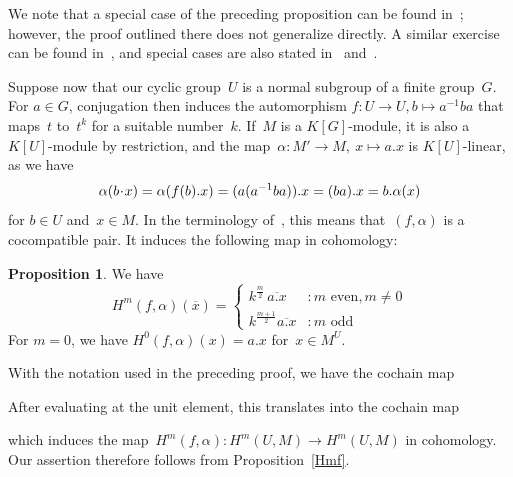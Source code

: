 \documentclass[12pt]{article}
\makeatletter
\newcounter{num}
\theoremstyle{definition}
\newtheorem{Proposition}[Satz]{Proposition}
\theoremstyle{break}
\renewenvironment{proof}[1][\proofname]{\par
\vspace{-5pt}%
\pushQED{\qed}%
\normalfont
\topsep0pt \partopsep0pt %
\trivlist
\item[\hskip\labelsep
\bfseries
#1\@addpunct{.}]\ignorespaces
}{%
\popQED\endtrivlist\@endpefalse
\addvspace{6pt plus 6pt} %
}
\DeclareMathOperator\Hom{Hom}
\DeclareMathOperator\id{id}
\renewcommand{\1}{\mathbbm{1}}
\newcommand{\scdot}{\mathbin{\mspace{-3mu} \cdot \mspace{-3mu}}}
\makeatother
\begin{document}
We note that a special case of the preceding proposition can be found in~\cite[Chap.~V, Sec.~3, Exerc.~4, p.~114]{Br}; however, the proof outlined there does not generalize directly. A similar exercise can be found in~\cite[Chap.~IV, \S~7, Exerc.~6, p.~124]{ML1}, and special cases are also stated in~\cite[Lem.~3, p.~343]{S1} and~\cite[Prop.~8.1, p.~283]{S2}.

Suppose now that our cyclic group~$U$ is a normal subgroup of a finite group~$G$. For $a \in G$, conjugation then induces the automorphism $f \colon U \to U, b \mapsto a^{-1} b a$ that maps~$t$ to~$t^k$ for a suitable number~$k$. If~$M$ is a $K[G]$-module, it is also a $K[U]$-module by restriction, and the map~$\alpha \colon M' \to M,~x \mapsto a.x$ is $K[U]$-linear, as we have
\[\alpha(b \scdot x) = \alpha(f(b).x) = (a (a^{-1} b a)).x = (ba).x = b.\alpha(x)\]
for $b \in U$ and~$x \in M$. In the terminology of~\cite[loc.~cit.]{Ro}, this means that~$(f,\alpha)$ is a cocompatible pair. It induces the following map in cohomology:
\begin{Proposition} \label{CohomCyclSubgr}
We have
\[H^m(f,\alpha)(\overline{x}) =
\begin{cases}
k^{\tfrac{m}{2}} \,  \overline{a.x} &: m \text{ even}, m \neq 0\\
k^{\tfrac{m+1}{2}}  \overline{a.x} &: m \text{ odd}
\end{cases}\]
For $m=0$, we have $H^0(f,\alpha)(x) = a.x$ for~$x \in M^U$.
\end{Proposition}
\begin{proof}
With the notation used in the preceding proof, we have the cochain map
\begin{center}
\end{center}
After evaluating at the unit element, this translates into the cochain map
\begin{center}
\end{center}
which induces the map~$H^m(f, \alpha) \colon H^m(U, M) \to H^m(U, M)$ in cohomology. Our assertion therefore follows from Proposition~\ref{Hmf}.
\end{proof}
\end{document}
